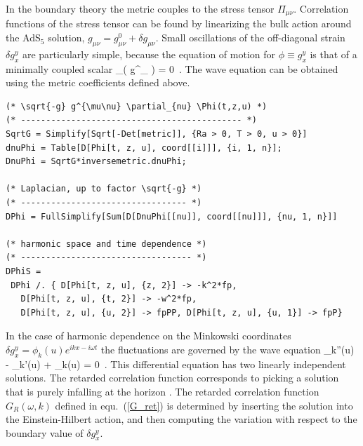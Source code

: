 \vspace*{0.3cm} 
 In the boundary theory the metric couples to the stress tensor 
$\Pi_{\mu\nu}$. Correlation functions of the stress tensor can be found 
by linearizing the bulk action around the AdS$_5$ solution, $g_{\mu\nu}=
g_{\mu\nu}^0+\delta g_{\mu\nu}$. Small oscillations of the off-diagonal 
strain $\delta g_x^y$ are particularly simple, because the equation of 
motion for $\phi\equiv g_x^y$ is that of a minimally coupled scalar
\be 
{}\partial_\mu \left( g^{\mu\nu}\partial_\nu 
 \phi\right) = 0\, .  
\ee 
The wave equation can be obtained using the metric coefficients defined
above. 

\vspace*{0.3cm} 
\begin{lstlisting}
(* \sqrt{-g} g^{\mu\nu} \partial_{nu} \Phi(t,z,u) *)
(* -------------------------------------------- *)
SqrtG = Simplify[Sqrt[-Det[metric]], {Ra > 0, T > 0, u > 0}]
dnuPhi = Table[D[Phi[t, z, u], coord[[i]]], {i, 1, n}];
DnuPhi = SqrtG*inversemetric.dnuPhi;

(* Laplacian, up to factor \sqrt{-g} *)
(* --------------------------------- *)
DPhi = FullSimplify[Sum[D[DnuPhi[[nu]], coord[[nu]]], {nu, 1, n}]]

(* harmonic space and time dependence *)
(* ---------------------------------- *)
DPhiS = 
 DPhi /. { D[Phi[t, z, u], {z, 2}] -> -k^2*fp, 
   D[Phi[t, z, u], {t, 2}] -> -w^2*fp, 
   D[Phi[t, z, u], {u, 2}] -> fpPP, D[Phi[t, z, u], {u, 1}] -> fpP}
\end{lstlisting}

\vspace*{0.3cm} 
In the case of harmonic dependence on the Minkowski coordinates $\delta g_x^y
=\phi_k(u)e^{ikx-i\omega t}$ the fluctuations are governed by the wave equation
\be
\label{lingrav}
\phi_k''(u) -  \phi_k'(u) 
      + 
  \phi_k(u) = 0\, .
\ee
This differential equation has two linearly independent solutions.
The retarded correlation function corresponds to picking a solution 
that is purely infalling at the horizon \cite{Son:2007vk}. The retarded 
correlation function $G_R(\omega,k)$ defined in equ.~(\ref{G_ret})
is determined by inserting the solution into the Einstein-Hilbert action, 
and then computing the variation with respect to the boundary value 
of $\delta g_x^y$. 

